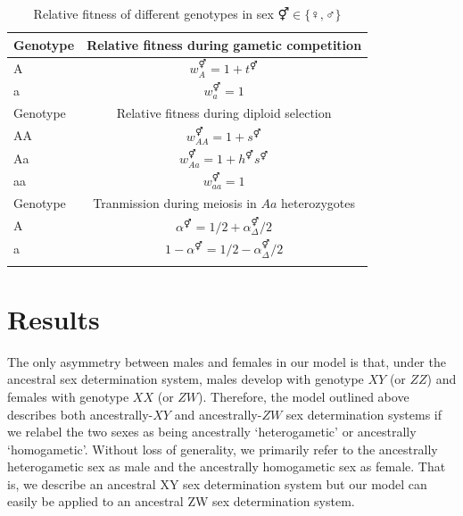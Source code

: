 \documentclass[12pt]{article}
\begin{document}
\begin{table}[ht]
\centering
\smallskip
\caption{Relative fitness of different genotypes in sex $\Hermaphrodite \in \{\female,\male\}$}
\begin{tabular}{l c }
\hline\hline
  Genotype & Relative fitness during gametic competition \\ [0.5ex] \hline
  A & $w_{A}^\Hermaphrodite = 1+t^\Hermaphrodite$ \\
  a & $w_{a}^\Hermaphrodite = 1$ \\ [0.5ex] \hline
  Genotype & Relative fitness during diploid selection \\ [0.5ex] \hline
  AA & $w_{AA}^\Hermaphrodite = 1+ s^\Hermaphrodite$ \\
  Aa & $w_{Aa}^\Hermaphrodite = 1+h^\Hermaphrodite s^\Hermaphrodite$ \\
  aa & $w_{aa}^\Hermaphrodite = 1$ \\ [0.5ex] \hline
  Genotype & Tranmission during meiosis in $Aa$ heterozygotes \\ [0.5ex] \hline
  A & $\alpha^\Hermaphrodite=1/2+\alpha_{\Delta}^{\Hermaphrodite}/2$ \\
  a & $1-\alpha^\Hermaphrodite=1/2-\alpha_{\Delta}^{\Hermaphrodite}/2$ \\
  \hline \hline
  \label{tab:fitnesstable}
 \end{tabular}
\end{table}


\section*{Results}

The only asymmetry between males and females in our model is that, under the ancestral sex determination system, males develop with genotype $XY$ (or $ZZ$) and females with genotype $XX$ (or $ZW$). 
Therefore, the model outlined above describes both ancestrally-$XY$ and ancestrally-$ZW$ sex determination systems if we relabel the two sexes as being ancestrally `heterogametic' or ancestrally `homogametic'. 
Without loss of generality, we primarily refer to the ancestrally heterogametic sex as male and the ancestrally homogametic sex as female.
That is, we describe an ancestral XY sex determination system but our model can easily be applied to an ancestral ZW sex determination system. 
\end{document}
